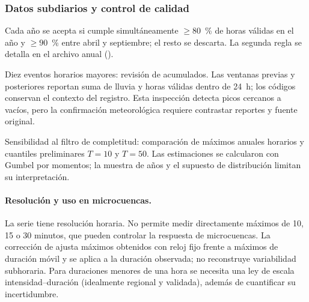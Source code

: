 
\subsubsection{Datos subdiarios y control de calidad}
Cada año se acepta si cumple simultáneamente $\geq 80$~\% de horas válidas en el año y $\geq 90$~\% entre abril y
septiembre; el resto se descarta. La segunda regla se detalla en el archivo anual
().

Diez eventos horarios mayores: revisión de acumulados. Las ventanas previas y posteriores reportan suma de lluvia y
horas válidas dentro de 24~h; los códigos conservan el contexto del registro. Esta inspección detecta picos cercanos
a vacíos, pero la confirmación meteorológica requiere contrastar reportes y fuente original.

Sensibilidad al filtro de completitud: comparación de máximos anuales horarios y cuantiles preliminares $T=10$ y
$T=50$. Las estimaciones se calcularon con Gumbel por momentos; la muestra de años y el supuesto de distribución
limitan su interpretación.

\paragraph{Resolución y uso en microcuencas.} La serie tiene resolución horaria. No permite medir directamente máximos
de 10, 15 o 30 minutos, que pueden controlar la respuesta de microcuencas. La corrección de \citet{weiss1964} ajusta
máximos obtenidos con reloj fijo frente a máximos de duración móvil y se aplica a la duración observada; no
reconstruye variabilidad subhoraria. Para duraciones menores de una hora se necesita una ley de escala
intensidad--duración (idealmente regional y validada), además de cuantificar su incertidumbre.

